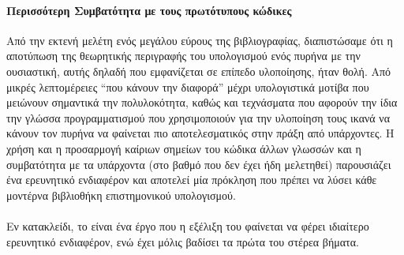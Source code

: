 \paragraph*{Περισσότερη Συμβατότητα με τους πρωτότυπους κώδικες}
Από την εκτενή μελέτη ενός μεγάλου εύρους της βιβλιογραφίας, διαπιστώσαμε ότι η αποτύπωση της θεωρητικής περιγραφής του υπολογισμού ενός πυρήνα με την ουσιαστική, αυτής δηλαδή που εμφανίζεται σε επίπεδο υλοποίησης, ήταν θολή.
Από μικρές λεπτομέρειες ``που κάνουν την διαφορά'' μέχρι υπολογιστικά μοτίβα που μειώνουν σημαντικά την πολυλοκότητα, καθώς και τεχνάσματα που αφορούν την ίδια την γλώσσα προγραμματισμού που χρησιμοποιούν για την υλοποίηση τους ικανά να κάνουν τον πυρήνα να φαίνεται πιο αποτελεσματικός στην πράξη από υπάρχοντες.
Η χρήση και η προσαρμογή καίριων σημείων του κώδικα άλλων γλωσσών και η συμβατότητα με τα υπάρχοντα (στο βαθμό που δεν έχει ήδη μελετηθεί) παρουσιάζει ένα ερευνητικό ενδιαφέρον και αποτελεί μία πρόκληση που πρέπει να λύσει κάθε μοντέρνα βιβλιοθήκη επιστημονικού υπολογισμού.\\
\paragraph*{}Εν κατακλείδι, το  είναι ένα έργο που η εξέλιξη του φαίνεται να φέρει ιδιαίτερο ερευνητικό ενδιαφέρον, ενώ έχει μόλις βαδίσει τα πρώτα του στέρεα βήματα.
